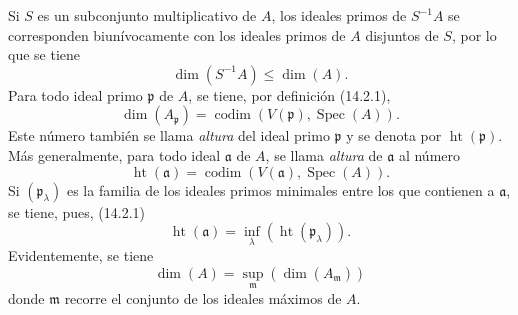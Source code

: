 \begin{env}[16.1.3]
\label{0.16.1.3-fr}

Si $S$ es un subconjunto multiplicativo de $A$, los ideales primos de
$S^{-1}A$ se corresponden biunívocamente con los ideales primos de $A$
disjuntos de $S$, por lo que se tiene
\[
\label{0.16.1.3.1-fr}
  \dim(S^{-1}A)\leq\dim(A).
\tag{16.1.3.1}
\]
Para todo ideal primo $\mathfrak{p}$ de $A$, se tiene, por definición (14.2.1),
\[
\label{0.16.1.3.2-fr}
  \dim(A_{\mathfrak{p}})
  =\operatorname{codim}(V(\mathfrak{p}),\operatorname{Spec}(A)).
\tag{16.1.3.2}
\]
Este número también se llama \emph{altura} del ideal primo $\mathfrak{p}$ y se denota
por $\operatorname{ht}(\mathfrak{p})$. Más generalmente, para todo ideal
$\mathfrak{a}$ de $A$, se llama \emph{altura} de $\mathfrak{a}$ al número
\[
\label{0.16.1.3.3-fr}
  \operatorname{ht}(\mathfrak{a})
  =\operatorname{codim}(V(\mathfrak{a}),\operatorname{Spec}(A)).
\tag{16.1.3.3}
\]
Si $(\mathfrak{p}_\lambda)$ es la familia de los ideales primos minimales entre
los que contienen a $\mathfrak{a}$, se tiene, pues, (14.2.1)
\[
\label{0.16.1.3.4-fr}
  \operatorname{ht}(\mathfrak{a})
  =\inf_\lambda(\operatorname{ht}(\mathfrak{p}_\lambda)).
\tag{16.1.3.4}
\]
Evidentemente, se tiene
\[
\label{0.16.1.3.5-fr}
  \dim(A)=\sup_{\mathfrak{m}}(\dim(A_{\mathfrak{m}}))
\tag{16.1.3.5}
\]
donde $\mathfrak{m}$ recorre el conjunto de los ideales máximos de $A$.
\end{env}

